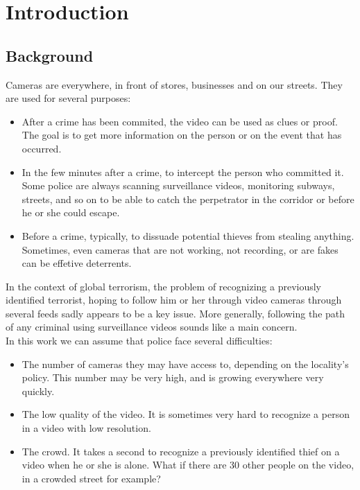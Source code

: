 \setlength{\footskip}{8mm}
\chapter{Introduction}

\section{Background}


Cameras are everywhere, in front of stores, businesses and on our streets. They are used for several purposes:\begin{itemize}
\item After a crime has been commited, the video can be used as clues or proof. The goal is to get more information on the person or on the event that has occurred.
\item In the few minutes after a crime, to intercept the person who committed it. Some police are always scanning surveillance videos, monitoring subways, streets, and so on to be able to catch the perpetrator in the corridor or before he or she could escape.
\item Before a crime, typically, to dissuade potential thieves from stealing anything. Sometimes, even cameras that are not working, not recording, or are fakes can be effetive deterrents.
\end{itemize}

In the context of global terrorism, the problem of recognizing a previously identified terrorist, hoping to follow him or her through video cameras through several feeds sadly appears to be a key issue. More generally, following the path of any criminal using surveillance videos sounds like a main concern.\\

In this work we can assume that police face several difficulties:\begin{itemize}
\item The number of cameras they may have access to, depending on the locality's policy. This number may be very high, and is growing everywhere very quickly.
\item The low quality of the video. It is sometimes very hard to recognize a person in a video with low resolution.
\item The crowd. It takes a second to recognize a previously identified thief on a video when he or she is alone. What if there are 30 other people on the video, in a crowded street for example?
\end{itemize}

